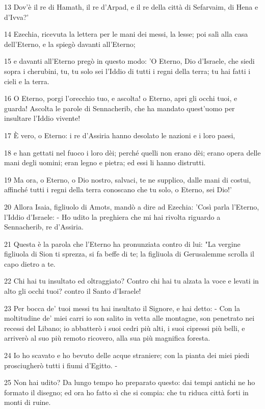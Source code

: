 \par 13 Dov'è il re di Hamath, il re d'Arpad, e il re della città di Sefarvaim, di Hena e d'Ivva?'
\par 14 Ezechia, ricevuta la lettera per le mani dei messi, la lesse; poi salì alla casa dell'Eterno, e la spiegò davanti all'Eterno;
\par 15 e davanti all'Eterno pregò in questo modo: 'O Eterno, Dio d'Israele, che siedi sopra i cherubini, tu, tu solo sei l'Iddio di tutti i regni della terra; tu hai fatti i cieli e la terra.
\par 16 O Eterno, porgi l'orecchio tuo, e ascolta! o Eterno, apri gli occhi tuoi, e guarda! Ascolta le parole di Sennacherib, che ha mandato quest'uomo per insultare l'Iddio vivente!
\par 17 È vero, o Eterno: i re d'Assiria hanno desolato le nazioni e i loro paesi,
\par 18 e han gettati nel fuoco i loro dèi; perché quelli non erano dèi; erano opera delle mani degli uomini; eran legno e pietra; ed essi li hanno distrutti.
\par 19 Ma ora, o Eterno, o Dio nostro, salvaci, te ne supplico, dalle mani di costui, affinché tutti i regni della terra conoscano che tu solo, o Eterno, sei Dio!'
\par 20 Allora Isaia, figliuolo di Amots, mandò a dire ad Ezechia: 'Così parla l'Eterno, l'Iddio d'Israele: - Ho udito la preghiera che mi hai rivolta riguardo a Sennacherib, re d'Assiria.
\par 21 Questa è la parola che l'Eterno ha pronunziata contro di lui: "La vergine figliuola di Sion ti sprezza, si fa beffe di te; la figliuola di Gerusalemme scrolla il capo dietro a te.
\par 22 Chi hai tu insultato ed oltraggiato? Contro chi hai tu alzata la voce e levati in alto gli occhi tuoi? contro il Santo d'Israele!
\par 23 Per bocca de' tuoi messi tu hai insultato il Signore, e hai detto: - Con la moltitudine de' miei carri io son salito in vetta alle montagne, son penetrato nei recessi del Libano; io abbatterò i suoi cedri più alti, i suoi cipressi più belli, e arriverò al suo più remoto ricovero, alla sua più magnifica foresta.
\par 24 Io ho scavato e ho bevuto delle acque straniere; con la pianta dei miei piedi prosciugherò tutti i fiumi d'Egitto. -
\par 25 Non hai udito? Da lungo tempo ho preparato questo: dai tempi antichi ne ho formato il disegno; ed ora ho fatto sì che si compia: che tu riduca città forti in monti di ruine.
